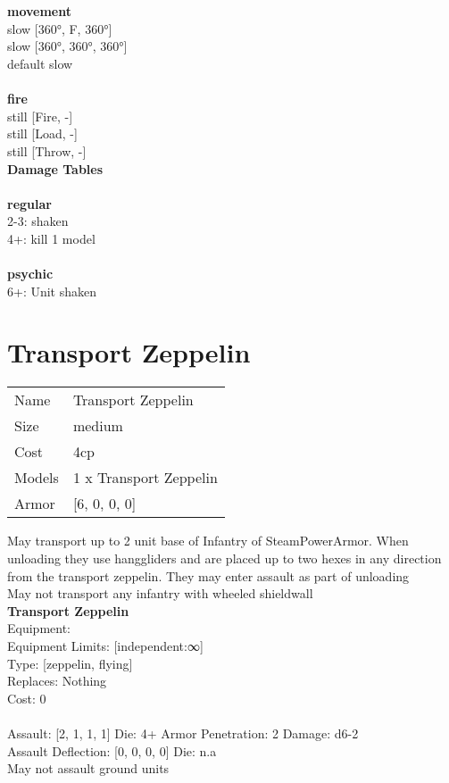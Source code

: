  
\ \\



\ \\ {\bf movement } \\
slow [360°, F, 360°] \\
slow [360°, 360°, 360°] \\
default slow \\
\ \\ {\bf fire } \\
still [Fire, -] \\
still [Load, -] \\
still [Throw, -] \\


{\bf Damage Tables} \\
\ \\ {\bf regular } \\
2-3: shaken \\
4+: kill 1 model \\
\ \\ {\bf psychic } \\
6+: Unit shaken \\










\pagebreak\pagebreak

\section{ Transport Zeppelin }

\begin{tabular}{ll}
  Name & Transport Zeppelin \\
  Size & medium\\
  Cost & 4cp\\
  Models & 1 x Transport Zeppelin\\
  Armor & [6, 0, 0, 0]\\
\end{tabular}

\noindent May transport up to 2 unit base of Infantry of SteamPowerArmor. When unloading they use hanggliders and are placed up to two hexes in any direction from the transport zeppelin. They may enter assault as part of unloading\\ 
May not transport any infantry with wheeled shieldwall\\ 


{\bf Transport Zeppelin } \\
Equipment:  \\
Equipment Limits: [independent:∞] \\
Type: [zeppelin, flying] \\
Replaces: Nothing \\
Cost: 0\\
\ \\
Assault: [2, 1, 1, 1] Die: 4+ Armor Penetration: 2 Damage: d6-2 \\
Assault Deflection: [0, 0, 0, 0] Die: n.a\\
\indent May not assault ground units\\ 
 
